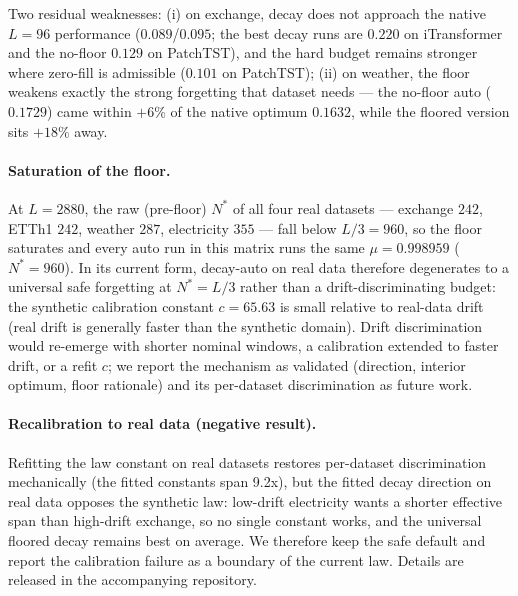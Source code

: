 Two residual weaknesses: (i) on exchange, decay does not approach the native $L{=}96$ performance ($0.089$/$0.095$; the best decay runs are $0.220$ on iTransformer and the no-floor $0.129$ on PatchTST), and the hard budget remains stronger where zero-fill is admissible ($0.101$ on PatchTST); (ii) on weather, the floor weakens exactly the strong forgetting that dataset needs --- the no-floor auto ($0.1729$) came within $+6\%$ of the native optimum $0.1632$, while the floored version sits $+18\%$ away.

\paragraph{Saturation of the floor.} At $L{=}2880$, the raw (pre-floor) $N^*$ of all four real datasets --- exchange $242$, ETTh1 $242$, weather $287$, electricity $355$ --- fall below $L/3 = 960$, so the floor saturates and every auto run in this matrix runs the same $\mu = 0.998959$ ($N^* = 960$). In its current form, decay-auto on real data therefore degenerates to a universal safe forgetting at $N^* = L/3$ rather than a drift-discriminating budget: the synthetic calibration constant $c = 65.63$ is small relative to real-data drift (real drift is generally faster than the synthetic domain). Drift discrimination would re-emerge with shorter nominal windows, a calibration extended to faster drift, or a refit $c$; we report the mechanism as validated (direction, interior optimum, floor rationale) and its per-dataset discrimination as future work.

\paragraph{Recalibration to real data (negative result).}
Refitting the law constant on real datasets restores per-dataset discrimination mechanically (the fitted constants span 9.2x), but the fitted decay direction on real data opposes the synthetic law: low-drift electricity wants a shorter effective span than high-drift exchange, so no single constant works, and the universal floored decay remains best on average. We therefore keep the safe default and report the calibration failure as a boundary of the current law. Details are released in the accompanying repository.
